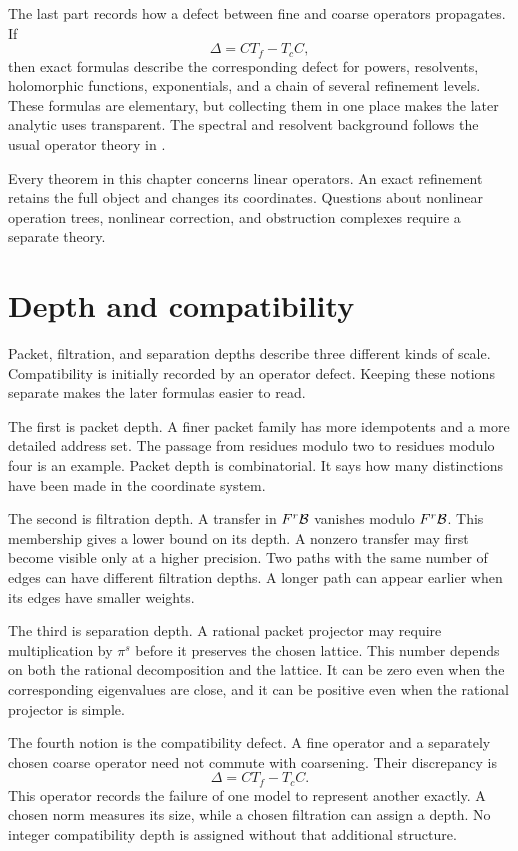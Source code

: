 The last part records how a defect between fine and coarse operators propagates.  If
\[
\Delta=CT_f-T_cC,
\]
then exact formulas describe the corresponding defect for powers, resolvents, holomorphic functions, exponentials, and a chain of several refinement levels.  These formulas are elementary, but collecting them in one place makes the later analytic uses transparent.  The spectral and resolvent background follows the usual operator theory in \cite{Kato1995}.

Every theorem in this chapter concerns linear operators. An exact refinement retains the full object and changes its coordinates. Questions about nonlinear operation trees, nonlinear correction, and obstruction complexes require a separate theory.

\section{Depth and compatibility}\label{sec:four_depths}

Packet, filtration, and separation depths describe three different kinds of scale. Compatibility is initially recorded by an operator defect. Keeping these notions separate makes the later formulas easier to read.

The first is packet depth.  A finer packet family has more idempotents and a more detailed address set.  The passage from residues modulo two to residues modulo four is an example.  Packet depth is combinatorial.  It says how many distinctions have been made in the coordinate system.

The second is filtration depth. A transfer in $F^r\mathcal B$ vanishes modulo $F^r\mathcal B$. This membership gives a lower bound on its depth. A nonzero transfer may first become visible only at a higher precision. Two paths with the same number of edges can have different filtration depths. A longer path can appear earlier when its edges have smaller weights.

The third is separation depth.  A rational packet projector may require multiplication by $\pi^s$ before it preserves the chosen lattice.  This number depends on both the rational decomposition and the lattice.  It can be zero even when the corresponding eigenvalues are close, and it can be positive even when the rational projector is simple.

The fourth notion is the compatibility defect. A fine operator and a separately chosen coarse operator need not commute with coarsening. Their discrepancy is
\[
\Delta=CT_f-T_cC.
\]
This operator records the failure of one model to represent another exactly. A chosen norm measures its size, while a chosen filtration can assign a depth. No integer compatibility depth is assigned without that additional structure.

